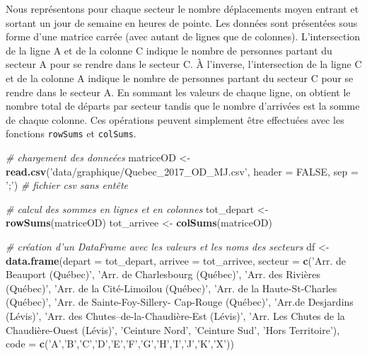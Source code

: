 \documentclass[
  11pt,
  french,
]{book}
\makeatletter
\newenvironment{Shaded}{\begin{snugshade}}{\end{snugshade}}
\newcommand{\CommentTok}[1]{\textcolor[rgb]{0.56,0.35,0.01}{\textit{#1}}}
\newcommand{\DataTypeTok}[1]{\textcolor[rgb]{0.13,0.29,0.53}{#1}}
\newcommand{\KeywordTok}[1]{\textcolor[rgb]{0.13,0.29,0.53}{\textbf{#1}}}
\newcommand{\NormalTok}[1]{#1}
\newcommand{\OtherTok}[1]{\textcolor[rgb]{0.56,0.35,0.01}{#1}}
\newcommand{\StringTok}[1]{\textcolor[rgb]{0.31,0.60,0.02}{#1}}
\newenvironment{kframe}{%
\medskip{}
\setlength{\fboxsep}{.8em}
 \def\at@end@of@kframe{}%
 \ifinner\ifhmode%
  \def\at@end@of@kframe{\end{minipage}}%
  \begin{minipage}{\columnwidth}%
 \fi\fi%
 \def\FrameCommand##1{\hskip\@totalleftmargin \hskip-\fboxsep
 \colorbox{shadecolor}{##1}\hskip-\fboxsep
     \hskip-\linewidth \hskip-\@totalleftmargin \hskip\columnwidth}%
 \MakeFramed {\advance\hsize-\width
   \@totalleftmargin\z@ \linewidth\hsize
   \@setminipage}}%
 {\par\unskip\endMakeFramed%
 \at@end@of@kframe}
\renewenvironment{Shaded}{\begin{kframe}}{\end{kframe}}
\makeatother
\begin{document}
Nous représentons pour chaque secteur le nombre déplacements moyen entrant et sortant un jour de semaine en heures de pointe. Les données sont présentées sous forme d'une matrice carrée (avec autant de lignes que de colonnes). L'intersection de la ligne A et de la colonne C indique le nombre de personnes partant du secteur A pour se rendre dans le secteur C. À l'inverse, l'intersection de la ligne C et de la colonne A indique le nombre de personnes partant du secteur C pour se rendre dans le secteur A. En sommant les valeurs de chaque ligne, on obtient le nombre total de départs par secteur tandis que le nombre d'arrivées est la somme de chaque colonne. Ces opérations peuvent simplement être effectuées avec les fonctions \texttt{rowSums} et \texttt{colSums}.

\begin{Shaded}
\begin{Highlighting}[]
\CommentTok{# chargement des donneées}
\NormalTok{matriceOD <-}\StringTok{ }\KeywordTok{read.csv}\NormalTok{(}\StringTok{'data/graphique/Quebec_2017_OD_MJ.csv'}\NormalTok{,}
                 \DataTypeTok{header =} \OtherTok{FALSE}\NormalTok{, }\DataTypeTok{sep =} \StringTok{';'}\NormalTok{) }\CommentTok{# fichier csv sans entête}

\CommentTok{# calcul des sommes en lignes et en colonnes}
\NormalTok{tot_depart <-}\StringTok{ }\KeywordTok{rowSums}\NormalTok{(matriceOD)}
\NormalTok{tot_arrivee <-}\StringTok{ }\KeywordTok{colSums}\NormalTok{(matriceOD)}

\CommentTok{# création d'un DataFrame avec les valeurs et les noms des secteurs}
\NormalTok{df <-}\StringTok{ }\KeywordTok{data.frame}\NormalTok{(}\DataTypeTok{depart =}\NormalTok{ tot_depart,}
                 \DataTypeTok{arrivee =}\NormalTok{ tot_arrivee, }
                 \DataTypeTok{secteur =} \KeywordTok{c}\NormalTok{(}\StringTok{'Arr. de Beauport (Québec)'}\NormalTok{,}
                            \StringTok{'Arr. de Charlesbourg (Québec)'}\NormalTok{,}
                            \StringTok{'Arr. des Rivières (Québec)'}\NormalTok{,}
                            \StringTok{'Arr. de la Cité-Limoilou (Québec)'}\NormalTok{,}
                            \StringTok{'Arr. de la Haute-St-Charles (Québec)'}\NormalTok{,}
                            \StringTok{'Arr. de Sainte-Foy-Sillery- Cap-Rouge (Québec)'}\NormalTok{,}
                            \StringTok{'Arr.de Desjardins (Lévis)'}\NormalTok{,}
                            \StringTok{'Arr. des Chutes–de-la-Chaudière-Est (Lévis)'}\NormalTok{,}
                            \StringTok{'Arr. Les Chutes de la Chaudière-Ouest (Lévis)'}\NormalTok{,}
                            \StringTok{'Ceinture Nord'}\NormalTok{,}
                            \StringTok{'Ceinture Sud'}\NormalTok{,}
                            \StringTok{'Hors Territoire'}\NormalTok{),}
                 \DataTypeTok{code =} \KeywordTok{c}\NormalTok{(}\StringTok{'A'}\NormalTok{,}\StringTok{'B'}\NormalTok{,}\StringTok{'C'}\NormalTok{,}\StringTok{'D'}\NormalTok{,}\StringTok{'E'}\NormalTok{,}\StringTok{'F'}\NormalTok{,}\StringTok{'G'}\NormalTok{,}\StringTok{'H'}\NormalTok{,}\StringTok{'I'}\NormalTok{,}\StringTok{'J'}\NormalTok{,}\StringTok{'K'}\NormalTok{,}\StringTok{'X'}\NormalTok{))}


\end{Highlighting}
\end{Shaded}
\end{document}
